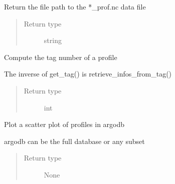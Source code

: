 \documentclass[letterpaper,10pt,english]{sphinxmanual}
\begin{document}

\begin{fulllineitems}
\label{\detokenize{pargopy:pargopy.argotools.get_profile_file_path}}
Return the file path to the *\_prof.nc data file
\begin{quote}\begin{description}
\item[{Return type}] \leavevmode
string

\end{description}\end{quote}

\end{fulllineitems}


\begin{fulllineitems}
\label{\detokenize{pargopy:pargopy.argotools.get_tag}}
Compute the tag number of a profile

The inverse of get\_tag() is retrieve\_infos\_from\_tag()
\begin{quote}\begin{description}
\item[{Return type}] \leavevmode
int

\end{description}\end{quote}

\end{fulllineitems}


\begin{fulllineitems}
\label{\detokenize{pargopy:pargopy.argotools.plot_location_profiles}}
Plot a scatter plot of profiles in argodb

argodb can be the full database or any subset
\begin{quote}\begin{description}
\item[{Return type}] \leavevmode
None

\end{description}\end{quote}

\end{fulllineitems}
\end{document}
